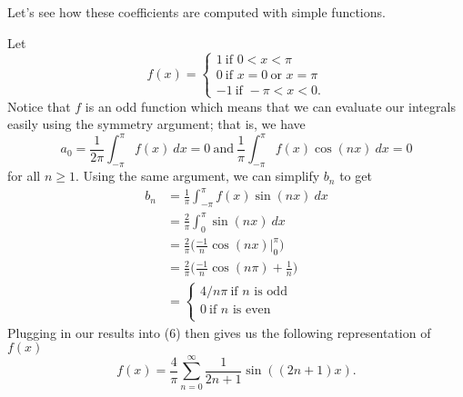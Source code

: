 Let's see how these coefficients are computed with simple functions.

\begin{example}{}{}
    Let 
    \[  f(x) = 
    \begin{cases}
        1 \ \text{if } 0 < x < \pi \\
        0 \ \text{if } x =0 \ \text{or } x = \pi \\
        -1 \ \text{if } -\pi < x < 0.
    \end{cases} \]
    Notice that \( f \) is an odd function which means that we can evaluate our integrals easily using the symmetry argument; that is, we have
    \[  a_{0} = \frac{ 1 }{ 2 \pi  } \int_{ -\pi  }^{ \pi  } f(x)  \ dx = 0 \ \text{and} \  \frac{ 1 }{ \pi  } \int_{ -\pi  }^{ \pi  } f(x) \cos(nx)  \ dx = 0  \]
    for all \( n \geq 1  \). Using the same argument, we can simplify \( b_{n} \) to get
    \begin{align*}
        b_{n} &= \frac{ 1 }{ \pi  } \int_{ -\pi  }^{ \pi  } f(x) \sin(nx)  \ dx \\
              &= \frac{ 2 }{ \pi  } \int_{ 0  }^{ \pi  } \sin(nx) \ dx \\
              &= \frac{ 2 }{ \pi  } \Big( \frac{ -1 }{ n }  \cos(nx) \Big|_{0}^{\pi} \Big)  \\
              &= \frac{ 2 }{ \pi  } \Big( \frac{ -1 }{ n }  \cos(n \pi) + \frac{ 1 }{ n } \Big) \\ 
              &= 
              \begin{cases}
                  4 / n\pi   \ \text{if } n \text{ is odd} \\
                  0   \ \text{if } n \text{ is even} \\
              \end{cases}
    \end{align*}
    Plugging in our results into (6) then gives us the following representation of \( f(x)  \)
    \[  f(x) = \frac{ 4  }{ \pi }  \sum_{ n=0  }^{ \infty  } \frac{ 1 }{ 2n+1 } \sin((2n+1)x). \]
\end{example}

